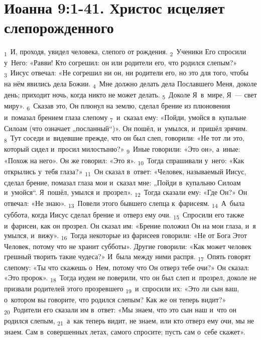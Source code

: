 \documentclass[a4paper,12pt]{article}
\begin{document}

\section{Иоанна 9:1-41. Христос исцеляет слепорожденного}

\textsubscript{1}~И, проходя, увидел человека, слепого от рождения.
\textsubscript{2}~Ученики Его спросили у~Него: «Равви! Кто согрешил: он или родители его, что родился слепым?»
\textsubscript{3}~Иисус отвечал: «Не согрешил ни он, ни родители его, но это для того, чтобы на нём явились дела Божии.
\textsubscript{4}~Мне должно делать дела Пославшего Меня, доколе день; приходит ночь, когда никто не может делать.
\textsubscript{5}~Доколе Я~в~мире, Я~— свет миру».
\textsubscript{6}~Сказав это, Он плюнул на землю, сделал брение из плюновения и~помазал брением глаза слепому
\textsubscript{7}~и~сказал ему: «Пойди, умойся в~купальне Силоам (что означает „посланный“)». Он пошёл, и~умылся, и~пришёл зрячим.
\textsubscript{8}~Тут соседи и~видевшие прежде, что он был слеп, говорили: «Не тот ли это, который сидел и~просил милостыню?»
\textsubscript{9}~Иные говорили: «Это он», а~иные: «Похож на него». Он же говорил: «Это я».
\textsubscript{10}~Тогда спрашивали у~него: «Как открылись у~тебя глаза?»
\textsubscript{11}~Он сказал в~ответ: «Человек, называемый Иисус, сделал брение, помазал глаза мои и~сказал мне: „Пойди в~купальню Силоам и~умойся“. Я~пошёл, умылся и~прозрел».
\textsubscript{12}~Тогда сказали ему: «Где Он?» Он отвечал: «Не знаю».
\textsubscript{13}~Повели этого бывшего слепца к~фарисеям.
\textsubscript{14}~А~была суббота, когда Иисус сделал брение и~отверз ему очи.
\textsubscript{15}~Спросили его также и~фарисеи, как он прозрел. Он сказал им: «Брение положил Он на мои глаза, и~я умылся, и~вижу».
\textsubscript{16}~Тогда некоторые из фарисеев говорили: «Не от Бога Этот Человек, потому что не хранит субботы». Другие говорили: «Как может человек грешный творить такие чудеса?» И~была между ними распря.
\textsubscript{17}~Опять говорят слепому: «Ты что скажешь о~Нем, потому что Он отверз тебе очи?» Он сказал: «Это пророк».
\textsubscript{18}~Тогда иудеи не поверили, что он был слеп и~прозрел, доколе не призвали родителей этого прозревшего
\textsubscript{19}~и~спросили их: «Это ли сын ваш, о~котором вы говорите, что родился слепым? Как же он теперь видит?»
\textsubscript{20}~Родители его сказали им в~ответ: «Мы знаем, что это сын наш и~что он родился слепым,
\textsubscript{21}~а~как теперь видит, не знаем, или кто отверз ему очи, мы не знаем. Сам в~совершенных летах, самого спросите; пусть сам о~себе скажет».
\end{document}
